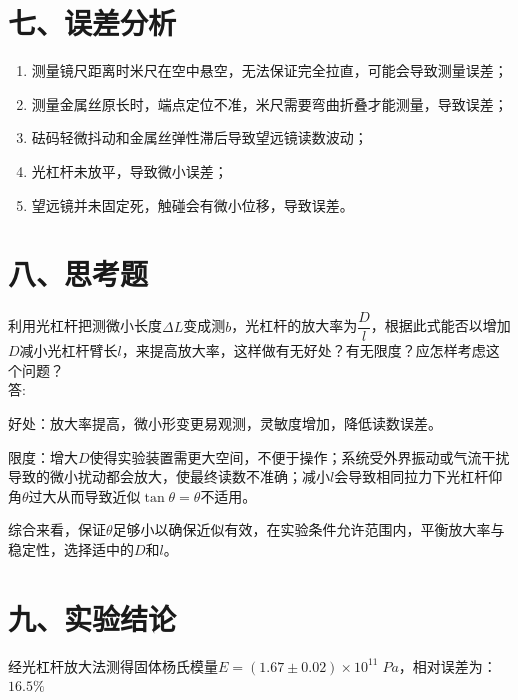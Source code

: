 \documentclass[11pt]{article}
\begin{document}
\section*{七、误差分析}

\begin{enumerate}
    \item 测量镜尺距离时米尺在空中悬空，无法保证完全拉直，可能会导致测量误差；
    \item 测量金属丝原长时，端点定位不准，米尺需要弯曲折叠才能测量，导致误差；
    \item 砝码轻微抖动和金属丝弹性滞后导致望远镜读数波动；
    \item 光杠杆未放平，导致微小误差；
    \item 望远镜并未固定死，触碰会有微小位移，导致误差。
\end{enumerate}

\section*{八、思考题}

利用光杠杆把测微小长度$\Delta L$变成测$b$，光杠杆的放大率为$\dfrac{D}{l}$，根据此式能否以增加$D$减小光杠杆臂长$l$，来提高放大率，这样做有无好处？有无限度？应怎样考虑这个问题？\\
答:

好处：放大率提高，微小形变更易观测，灵敏度增加，降低读数误差。

限度：增大$D$使得实验装置需更大空间，不便于操作；系统受外界振动或气流干扰导致的微小扰动都会放大，使最终读数不准确；减小$l$会导致相同拉力下光杠杆仰角$\theta$过大从而导致近似$\tan{\theta}=\theta$不适用。

综合来看，保证$\theta$足够小以确保近似有效，在实验条件允许范围内，平衡放大率与稳定性，选择适中的$D$和$l$。

\section*{九、实验结论}

经光杠杆放大法测得固体杨氏模量$E=(1.67\pm0.02)\times10^{11}\;Pa$，相对误差为：$16.5\%$
\end{document}
